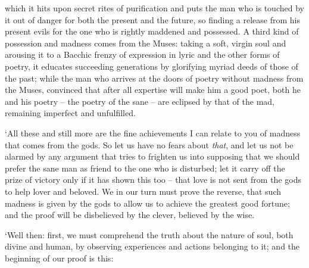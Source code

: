 which it hits upon secret rites of purification and puts the man who is
touched by it out of
danger for both the present and the future, so finding a release from
his present evils for the one  who is rightly maddened and
possessed. A third kind of possession and madness comes from the
Muses: taking a soft,
virgin soul and arousing it to a Bacchic frenzy of expression in lyric
and the other forms of poetry, it educates succeeding 
generations by glorifying myriad deeds of those of the past; while the
man who arrives at the doors of poetry without madness from the Muses,
convinced that after all expertise will make him a good poet, both he
and his poetry -- the poetry of the sane -- are eclipsed by that of the
mad, remaining imperfect and unfulfilled.

‘All these and still more are the fine achievements I can relate
 to you of madness that comes from the gods. So let us have no
fears about {\em that}, and let us not be alarmed by any argument that
tries to frighten us into supposing that we should prefer the sane man
as friend to the one who is disturbed; let it carry  off the
prize of victory only if it has shown this too -- that love is not sent
from the gods to help lover and beloved. We in our turn must prove the
reverse, that such madness is given by the  gods to allow us to
achieve the greatest good fortune; and the proof will be disbelieved by
the clever, believed by the wise.

‘Well then: first, we must comprehend the truth about the nature of
soul, both divine and human, by observing experiences and actions
belonging to it; and the beginning of our  proof is this:

